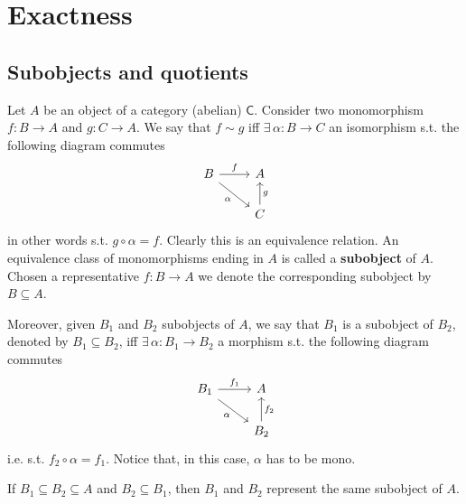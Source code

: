 \section{Exactness}
\subsection{Subobjects and quotients}
\begin{defn}[Subobject]
	Let $A$ be an object of a category (abelian) $\mathsf{C}$.
	Consider two monomorphism $f: B \to A$ and $g: C \to A$.
	We say that $f \sim g$ iff 
	$\exists\, \alpha: B \to C$ an isomorphism s.t. the following diagram commutes
	\begin{equation}
	\begin{tikzcd}
		B \arrow[r, "f", rightarrow] \arrow[rd, "\alpha"', rightarrow] &
		A\\
		&
		C \arrow[u, "g"', rightarrow] 
	\end{tikzcd}
	\end{equation} 
	in other words s.t. $g \circ \alpha = f$.
	Clearly this is an equivalence relation.
	An equivalence class of monomorphisms ending in $A$ is called a \textbf{subobject} of $A$.
	Chosen a representative $f: B \to A$ we denote the corresponding subobject by $B \subseteq A$.

	Moreover, given $B_1$ and $B_2$ subobjects of $A$, we say that $B_1$ is a subobject of $B_2$, 
	denoted by $B_1 \subseteq B_2$, iff
	$\exists\, \alpha: B_1 \to B_2$ a morphism s.t. the following diagram commutes
	\begin{equation}
	\begin{tikzcd}
		B_1 \arrow[r, "f_1", rightarrow] \arrow[rd, "\alpha"', rightarrow] &
		A\\
		&
		B_2 \arrow[u, "f_2"', rightarrow] 
	\end{tikzcd}
	\end{equation} 
	i.e. s.t. $f_2 \circ \alpha = f_1$.
	Notice that, in this case, $\alpha$ has to be mono.
\end{defn}

\begin{rem}
	If $B_1 \subseteq B_2 \subseteq A$ and $B_2 \subseteq B_1$, then $B_1$ and $B_2$ represent the same subobject of $A$.
\end{rem}

